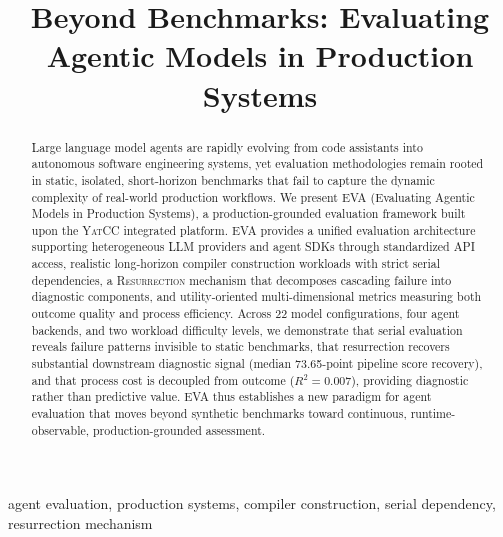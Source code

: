 \documentclass[conference]{IEEEtran}
\title{Beyond Benchmarks: Evaluating Agentic Models in Production Systems}
\author{\IEEEauthorblockN{Anonymous Authors}
\IEEEauthorblockA{\textit{Anonymous Institution}\\
\texttt{anonymous@anonymous.org}}
}
\newcommand{\eva}{\textsc{EVA}}
\newcommand{\yatcc}{\textsc{YatCC}}
\newcommand{\resurrection}{\textsc{Resurrection}}
\begin{document}
\maketitle

\begin{abstract}
Large language model agents are rapidly evolving from code assistants into autonomous software engineering systems, yet evaluation methodologies remain rooted in static, isolated, short-horizon benchmarks that fail to capture the dynamic complexity of real-world production workflows. We present \eva{} (Evaluating Agentic Models in Production Systems), a production-grounded evaluation framework built upon the \yatcc{} integrated platform. \eva{} provides a unified evaluation architecture supporting heterogeneous LLM providers and agent SDKs through standardized API access, realistic long-horizon compiler construction workloads with strict serial dependencies, a \resurrection{} mechanism that decomposes cascading failure into diagnostic components, and utility-oriented multi-dimensional metrics measuring both outcome quality and process efficiency. Across 22 model configurations, four agent backends, and two workload difficulty levels, we demonstrate that serial evaluation reveals failure patterns invisible to static benchmarks, that resurrection recovers substantial downstream diagnostic signal (median 73.65-point pipeline score recovery), and that process cost is decoupled from outcome ($R^2 = 0.007$), providing diagnostic rather than predictive value. \eva{} thus establishes a new paradigm for agent evaluation that moves beyond synthetic benchmarks toward continuous, runtime-observable, production-grounded assessment.
\end{abstract}

\begin{IEEEkeywords}
agent evaluation, production systems, compiler construction, serial dependency, resurrection mechanism
\end{IEEEkeywords}












\appendices


\end{document}
